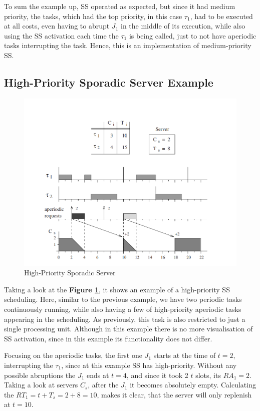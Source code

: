 \documentclass[conference]{IEEEtran}
\begin{document}
To sum the example up, SS operated as expected, but since it had medium priority, the tasks, which had the top priority, in this case $\tau_1$, had to be executed at all costs, even having to abrupt $J_1$ in the middle of its execution, while also using the SS activation each time the $\tau_1$ is being called, just to not have aperiodic tasks interrupting the task. Hence, this is an implementation of medium-priority SS.

\subsection{High-Priority Sporadic Server Example}

\begin{figure}[htbp]
\centerline{\includegraphics[scale=.39]{Example2.png}}
\caption{High-Priority Sporadic Server}
\label{example2}
\end{figure}

Taking a look at the \textbf{Figure \ref{example2}}, it shows an example of a high-priority SS scheduling. Here, similar to the previous example, we have two periodic tasks continuously running, while also having a few of high-priority aperiodic tasks appearing in the scheduling. As previously, this task is also restricted to just a single processing unit. Although in this example there is no more visualisation of SS activation, since in this example its functionality does not differ.

Focusing on the aperiodic tasks, the first one $J_1$ starts at the time of $t = 2$, interrupting the $\tau_1$, since at this example SS has high-priority. Without any possible abruptions the $J_1$ ends at $t = 4$, and since it took 2 $t$ slots, its $RA_1 = 2$. Taking a look at servers $C_s$, after the $J_1$ it becomes absolutely empty. Calculating the $RT_1 = t + T_s = 2 + 8 = 10$, makes it clear, that the server will only replenish at $t = 10$.
\end{document}
